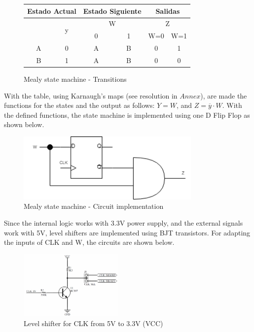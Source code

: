 \begin{figure}[H]
    \begin{center}
        \begin{tabular}{|c|c|c|c||c|c|}
            \hline 
            \multicolumn{2}{|c|}{Estado Actual} & \multicolumn{2}{c||}{Estado Siguiente} & \multicolumn{2}{c|}{Salidas}\tabularnewline
            \hline 
            \hline 
            \multirow{2}{*}{} & \multirow{2}{*}{y} & \multicolumn{2}{c||}{W} & \multicolumn{2}{c|}{Z}\tabularnewline
            \cline{3-6} 
             &  & \multicolumn{1}{c|}{0} & \multicolumn{1}{c||}{1} & W=0 & W=1\tabularnewline
            \hline 
            A & 0 & A & B & 0 & 1\tabularnewline
            \hline 
            B & 1 & A & B & 0 & 0\tabularnewline
            \hline 
            \end{tabular}
        \caption{Mealy state machine - Transitions}
    \end{center}
\end{figure}

With the table, using Karnaugh's maps (see resolution in $Annex$), are made 
the functions for the states and the output as follows: $Y = W$, and $Z = \overline{y} \cdot W$.
With the defined functions, the state machine is 
implemented using one D Flip Flop as shown below.

\begin{figure}[H]
    \begin{centering}
    \includegraphics[width=0.8\textwidth]{data/Graficos3/3b_Compuertas_Mealy.png}
    \par\end{centering}
    \caption{Mealy state machine - Circuit implementation}
\end{figure}

\newpage
Since the internal logic works with 3.3V power supply, 
and the external signals work with 5V, level shifters 
are implemented using BJT transistors. For adapting
the inputs of CLK and W, the circuits are shown 
below. 

\begin{figure}[H]
    \begin{centering}
    \includegraphics[width=0.45\textwidth]{data/Graficos3/CLK_Driver.png}
    \par\end{centering}
    \caption{Level shifter for CLK from 5V to 3.3V (VCC)}
\end{figure}


